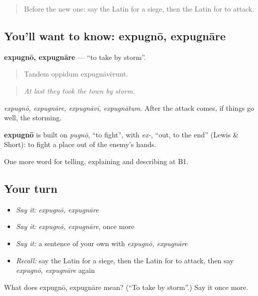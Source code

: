 \begin{quote}
Before the new one: say the Latin for a siege, then the Latin for to attack.
\end{quote}

\subsection*{You'll want to know: expugnō, expugnāre}
\textbf{expugnō, expugnāre} — \textquotedblleft{}to take by storm\textquotedblright{}.

\begin{quote}
Tandem oppidum expugnāvērunt.
\end{quote}

\begin{quote}
\emph{At last they took the town by storm.}
\end{quote}

\emph{expugnō, expugnāre, expugnāvī, expugnātum}. After the attack comes, if things go well, the storming.

\begin{cousinweb}
\textbf{expugnō} is built on \emph{pugnō}, \textquotedblleft{}to fight\textquotedblright{}, with \emph{ex-}, \textquotedblleft{}out, to the end\textquotedblright{} (Lewis \& Short): to fight a place out of the enemy's hands.
\end{cousinweb}

\begin{grammarlens}[title={What you've built}]
One more word for telling, explaining and describing at B1.
\end{grammarlens}

\subsection*{Your turn}
\begin{itemize}
\raggedright
  \item \emph{Say it:} \emph{expugnō, expugnāre}
  \item \emph{Say it:} \emph{expugnō, expugnāre}, once more
  \item \emph{Say it:} a sentence of your own with \emph{expugnō, expugnāre}
  \item \emph{Recall:} say the Latin for a siege, then the Latin for to attack, then say \emph{expugnō, expugnāre} again
\end{itemize}

\begin{tcolorbox}[breakable,colback=teal!4,colframe=teal!35!black,title={Before you move on}]
What does expugnō, expugnāre mean? (\textquotedblleft{}To take by storm\textquotedblright{}.) Say it once more.
\end{tcolorbox}
